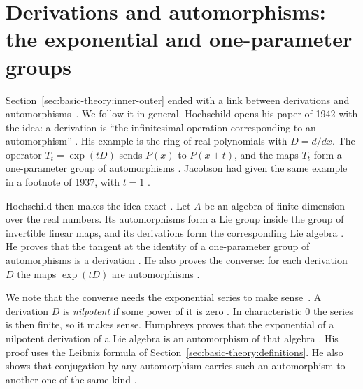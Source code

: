 \section{Derivations and automorphisms: the exponential and one-parameter groups}\label{sec:basic-theory:exponential}

Section~\ref{sec:basic-theory:inner-outer} ended with a link between
derivations and automorphisms~\cite[p.~206]{Jacobson1937}. We follow it in general. Hochschild opens his
paper of 1942 with the idea: a derivation is ``the infinitesimal operation
corresponding to an automorphism'' \cite[p.~677]{Hochschild1942}. His example
is the ring of real polynomials with $D = d/dx$. The operator $T_t = \exp(tD)$
sends $P(x)$ to $P(x+t)$, and the maps $T_t$ form a one-parameter group of
automorphisms \cite[p.~677]{Hochschild1942}. Jacobson had given the same
example in a footnote of 1937, with $t = 1$ \cite[p.~206]{Jacobson1937}.

Hochschild then makes the idea exact \cite[p.~678]{Hochschild1942}. Let $A$ be
an algebra of finite dimension over the real numbers. Its automorphisms form a
Lie group inside the group of invertible linear maps, and its derivations form
the corresponding Lie algebra \cite[p.~678]{Hochschild1942}. He proves that
the tangent at the identity of a one-parameter group of automorphisms is a
derivation \cite[p.~678]{Hochschild1942}. He also proves the converse: for
each derivation $D$ the maps $\exp(tD)$ are automorphisms
\cite[p.~678]{Hochschild1942}.

We note that the converse needs the exponential series to make sense~\cite[\S2.3, p.~9]{Humphreys1972}. A
derivation $D$ is \emph{nilpotent} if some power of it is zero \cite[\S2.3,
p.~8]{Humphreys1972}. In characteristic $0$ the series is then finite, so it
makes sense. Humphreys proves that the exponential of a nilpotent derivation
of a Lie algebra is an automorphism of that algebra \cite[\S2.3,
pp.~8--9]{Humphreys1972}. His proof uses the Leibniz formula of
Section~\ref{sec:basic-theory:definitions}. He also shows that conjugation by
any automorphism carries such an automorphism to another one of the same kind
\cite[\S2.3, p.~9]{Humphreys1972}.

